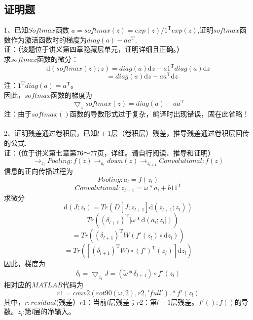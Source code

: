 \documentclass[UFT8]{ctexart}
\begin{document}
\subsection{证明题}
1、已知$Softmax$函数 $a = softmax(z) =exp(z)/1^\mathrm{T}exp(z)$,证明$softmax$函数作为激活函数时的梯度为$diag(a) - aa^\mathrm{T}$.\\
证：（该题位于讲义第四章隐藏层单元，证明详细且正确。）\\
求$softmax$函数的微分：\\
\begin{displaymath}
\mathrm{d} (softmax(z);z) = diag(a)\mathrm{d} z - a1^\mathrm{T}diag(a)\mathrm{d} z
\end{displaymath}
\[ \qquad \qquad = diag(a)\mathrm{d}z - aa^\mathrm{T}\mathrm{d}z\]
注：$1^\mathrm{T}diag(a) = a^\mathrm{T}$。\\
因此，$softmax$函数的梯度为
\[ \bigtriangledown_{z}softmax(z) = diag(a) - aa^\mathrm{T} \]
注：由于$softmax()$函数的导数形式过于复杂，编译时出现错误，固在此省略！
~\\

2、证明残差通过卷积层，已知$l+1$层（卷积层）残差，推导残差通过卷积层回传的公式. \\
证：（位于讲义第七章第76～77页，详细。请自行阅读、推导和证明）
\[ \to_{z_{l}} Pooling:f(z) \to_{a_{l}} down(z) \to_{z_{l+1}} Convolutional:f(z) \] 
信息的正向传播过程为
\[ Pooling: a_{l} = f(z_{l}) \]
\[Convolutional: z_{l+1} = \omega \ast a_{l} + b11^\mathrm{T} \]
求微分
\[ \mathrm{d}(J;z_{l}) = Tr(D[J;z_{l+1}]\mathrm{d}(z_{l+1};z_{l}))  \]
\[ = Tr((\delta_{l+1})^\mathrm{T}[\omega \ast \mathrm{d}(a_{l};z_{l}])) \]
\[ =Tr((\delta_{l+1})^\mathrm{T}W(f'(z_{l}) \circ \mathrm{d}z_{l})) \]
\[ = Tr([(\delta_{l+1})^\mathrm{T}W) \circ (f')^\mathrm{T}(z_{l})]\mathrm{d}z_{l}) \]
因此，梯度为
\[ \delta_{l} = \bigtriangledown_{z_{l}}J = (\widetilde{\omega} \ast \delta_{l+1}) \circ f'(z_{l}) \]
相对应的$MATLAB$代码为
\[ r1 = conv2(rot90(\omega,2),r2,'full') .*f'(z_{l}) \]
其中，$r:residual$(残差）$r1$：当前$l$层残差；$r2$：第$l+1$层残差。$f'():f()$的导数。$z_{l}$:第$l$层的净输入。\\
~\\
~\\
\end{document}
